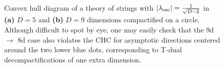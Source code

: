\begin{figure}[htb]
\begin{center}
	\qquad 
	\caption{Convex hull diagram of a theory of strings with $|\lambda_{\rm osc}|=\frac{1}{\sqrt{D-2}}$ in \textbf{(a)} $D=5$ and \textbf{(b)} $D=9$ dimensions compactified on a circle. Although difficult to spot by eye, one may easily check that the 9d $\to$ 8d case also violates the CHC for asymptotic directions centered around the two lower blue dots, corresponding to T-dual decompactifications of one extra dimension.}
	\label{fig:ch4}	
\end{center}
\end{figure}

